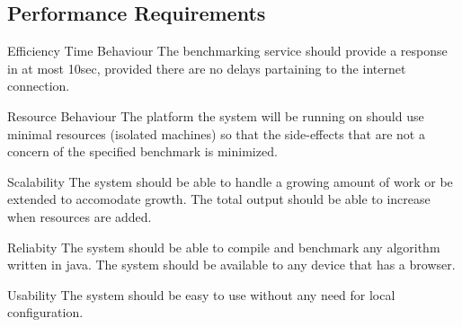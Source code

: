 \documentclass[runningheads,a4paper]{article}
\begin{document}
\subsection{Performance Requirements}
	Efficiency
		Time Behaviour 
		The benchmarking service should provide a response in at most 10sec, provided there are no delays partaining to the internet connection.
	
		Resource Behaviour
		The platform the system will be running on should use minimal resources (isolated machines) so that the side-effects that are not a concern
		of the specified benchmark is minimized.
	
	Scalability
		The system should be able to handle a growing amount of work or be extended to accomodate growth. The total output should be able to increase 
		when resources are added.

	Reliabity
		The system should be able to compile and benchmark any algorithm written in java.
		The system should be available to any device that has a browser.

	Usability
		The system should be easy to use without any need for local configuration.



     
     
\end{document}
